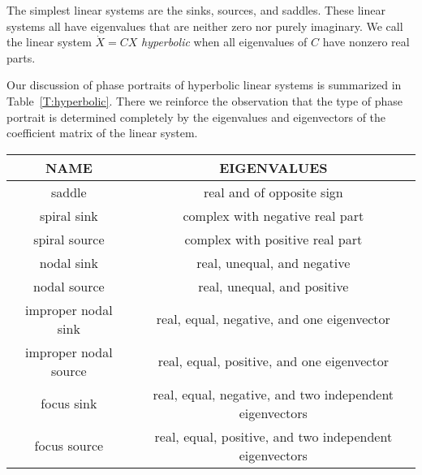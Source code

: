 \documentclass{ximera}
\begin{document}
The simplest linear systems are the sinks, sources, and saddles.
These linear systems all have eigenvalues that are neither zero
nor purely imaginary.  We call the linear system $\dot{X}=CX$
{\em hyperbolic\/} when all eigenvalues of $C$ have nonzero
real parts.  

Our discussion of phase portraits of hyperbolic linear systems is
summarized in Table~\ref{T:hyperbolic}.  There we reinforce the
observation that the type of phase portrait is determined completely
by the eigenvalues and eigenvectors of the coefficient matrix of the
linear system.

\begin{table*}[htb]
  \begin{center}
\begin{tabular}{|c|c|}
\hline
NAME & EIGENVALUES \\
\hline
saddle    & real and of opposite sign\\
\hline
spiral  sink & complex with negative real part \\
spiral source & complex with positive real part \\
\hline
nodal sink & real, unequal, and negative\\
nodal source & real, unequal, and positive\\
\hline
improper nodal sink & real, equal, negative, and one eigenvector\\
improper nodal source & real, equal, positive, and one eigenvector\\
\hline
focus sink & real, equal, negative, and two independent eigenvectors\\
focus source & real, equal, positive, and two independent eigenvectors\\
\hline
\end{tabular}
\end{center}
\caption{Classification of planar hyperbolic equilibria.}
\label{T:hyperbolic}
\end{table*}
\end{document}
